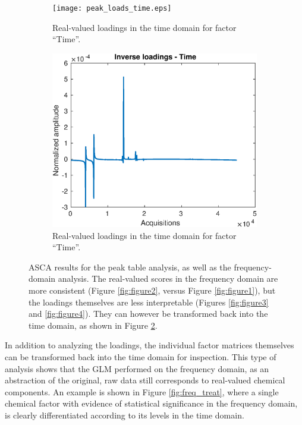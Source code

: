 \documentclass[preprint,12pt]{elsarticle}
\begin{document}
\begin{figure}[hbtp!]
\begin{subfigure}[b]{0.45\textwidth}
        \centering
        \texttt{[image: peak\_loads\_time.eps]}
        \caption{Real-valued loadings in the time domain for factor ``Time''.}
        \label{fig:figure5}
    \end{subfigure}
    \hfill
    \begin{subfigure}[b]{0.45\textwidth}
        \centering
        \includegraphics[width=\textwidth]{time_peaks.eps}
        \caption{Real-valued loadings in the time domain for factor ``Time''.}
        \label{fig:figure6}
    \end{subfigure}
    \caption{ASCA results for the peak table analysis, as well as the frequency-domain analysis. The real-valued scores in the frequency domain are more consistent (Figure \ref{fig:figure2}, versus Figure \ref{fig:figure1}), but the loadings themselves are less interpretable (Figures \ref{fig:figure3} and \ref{fig:figure4}). They can however be transformed back into the time domain, as shown in Figure \ref{fig:figure6}.}
    \label{fig:subfigures}
\end{figure}

In addition to analyzing the loadings, the individual factor matrices themselves can be transformed back into the time domain for  inspection. This type of analysis shows that the GLM performed on the frequency domain, as an abstraction of the original, raw data still corresponds to real-valued chemical components. An example is shown in Figure \ref{fig:freq_treat}, where a single chemical factor with evidence of statistical significance in the frequency domain, is clearly differentiated according to its levels in the time domain.
\end{document}
